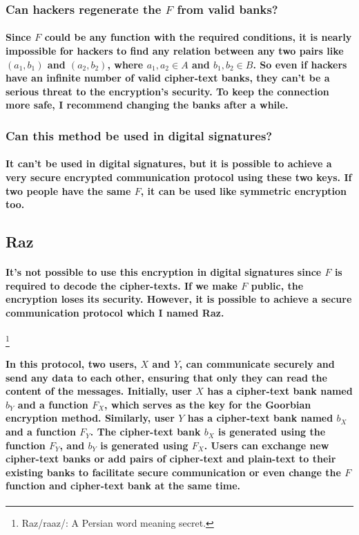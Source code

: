 \documentclass[oneside]{book}
\newcommand{\myparagraph}[1]{\paragraph{\textnormal{#1}}}
\begin{document}
\subsubsection*{Can hackers regenerate the $F$ from valid banks?}

\myparagraph{
Since $F$ could be any function with the required conditions, it is nearly impossible for hackers to find any relation between any two pairs like $(a_1, b_1)$ and $(a_2, b_2)$, where $a_1, a_2 \in A$ and $b_1, b_2 \in B$. So even if hackers have an infinite number of valid cipher-text banks, they can't be a serious threat to the encryption's security. To keep the connection more safe, I recommend changing the banks after a while.
}

\subsubsection{Can this method be used in digital signatures?}

\myparagraph{
It can't be used in digital signatures, but it is possible to achieve a very secure encrypted communication protocol using these two keys. If two people have the same $F$, it can be used like symmetric encryption too.
}

\subsection{Raz}

\myparagraph{
It's not possible to use this encryption in digital signatures since $F$ is required to decode the cipher-texts. If we make $F$ public, the encryption loses its security. However, it is possible to achieve a secure communication protocol which I named \textbf{Raz}.
}
\footnote{Raz/raaz/: A Persian word meaning secret.}

\myparagraph{
In this protocol, two users, $X$ and $Y$, can communicate securely and send any data to each other, ensuring that only they can read the content of the messages. Initially, user $X$ has a cipher-text bank named $b_Y$ and a function $F_X$, which serves as the key for the Goorbian encryption method. Similarly, user $Y$ has a cipher-text bank named $b_X$ and a function $F_Y$. The cipher-text bank $b_X$ is generated using the function $F_Y$, and $b_Y$ is generated using $F_X$. Users can exchange new cipher-text banks or add pairs of cipher-text and plain-text to their existing banks to facilitate secure communication or even change the $F$ function and cipher-text bank at the same time.
}
\end{document}
